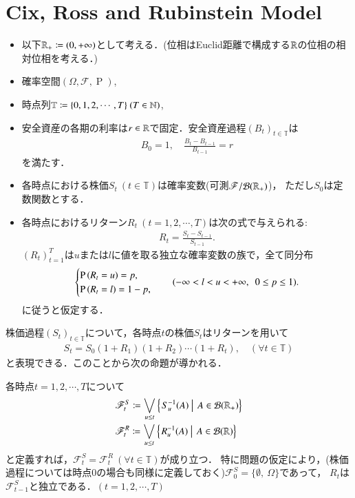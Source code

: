 \section{Cix, Ross and Rubinstein Model}
\begin{asm}[問題の仮定]\mbox{}
\begin{itemize}
	\item 以下$\mathbb{R}_+ \coloneqq (0, +\infty)$として考える．(位相はEuclid距離で構成する$\mathbb{R}$の位相の相対位相を考える．) 
	\item 確率空間$(\Omega, \mathscr{F}, \operatorname{P})$,
	\item 時点列$\mathbb{T} \coloneqq \{0, 1, 2, \cdots, T\} \ (T \in \mathbb{N})$,
	\item 安全資産の各期の利率は$r \in \mathbb{R}$で固定．安全資産過程$(B_t)_{t \in \mathbb{T}}$は
		\begin{align}
			B_0 = 1, \quad \frac{B_t - B_{t-1}}{B_{t-1}} = r
		\end{align}
		を満たす．
	\item 各時点における株価$S_t\ (t \in \mathbb{T})$は確率変数(可測$\mathscr{F}/\mathcal{B}(\mathbb{R}_+)$)，
		ただし$S_0$は定数関数とする．
	\item 各時点におけるリターン$R_t\ (t = 1,2,\cdots,T)$は次の式で与えられる:
		\begin{align}
			R_t = \frac{S_t - S_{t-1}}{S_{t-1}}.
		\end{align}
		$(R_t)_{t=1}^{T}$は$u$または$l$に値を取る独立な確率変数の族で，全て同分布
		\begin{align}
			\begin{cases}
				\operatorname{P} \left(R_t = u\right) = p, \\
				\operatorname{P} \left(R_t = l\right) = 1-p,
			\end{cases}
			\quad(-\infty < l < u < +\infty,\ \ 0 \leq p \leq 1).
		\end{align}
		に従うと仮定する．
\end{itemize}
\end{asm}

株価過程$(S_t)_{t \in \mathbb{T}}$について，各時点$t$の株価$S_t$はリターンを用いて
\begin{align}
	S_t = S_0 (1 + R_1)(1 + R_2)\cdots(1 + R_t), \quad (\forall t \in \mathbb{T})
\end{align}
と表現できる．このことから次の命題が導かれる．

\begin{prp}
	各時点$t = 1,2,\cdots,T$について
	\begin{align}
		&\mathscr{F}_t^S \coloneqq \bigvee_{u \leq t}\left\{\left.S_u^{-1}(A)\ \right|\ A \in \mathcal{B}(\mathbb{R}_+)\right\} \\
		&\mathscr{F}_t^R \coloneqq \bigvee_{u \leq t}\left\{\left.R_u^{-1}(A)\ \right|\ A \in \mathcal{B}(\mathbb{R})\right\} 
	\end{align}
	と定義すれば，$\mathscr{F}_t^S = \mathscr{F}_t^R\ (\forall t \in \mathbb{T})$が成り立つ．
	特に問題の仮定により，(株価過程については時点0の場合も同様に定義しておく)$\mathscr{F}_0^S = \{\emptyset,\ \Omega\}$であって，
	$R_t$は$\mathscr{F}_{t-1}^S$と独立である．$(t = 1,2,\cdots,T)$
\end{prp}

